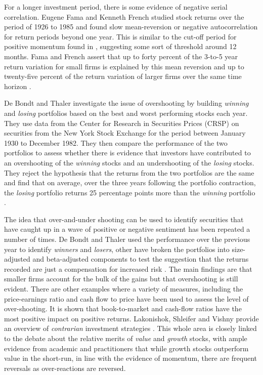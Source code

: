 \documentclass[12pt, a4paper, oneside]{article} %
\begin{document}
For a longer investment period, there is some evidence of negative serial correlation.  Eugene Fama and Kenneth French studied stock returns over the period of 1926 to 1985 and found slow mean-reversion or negative autocorrelation for return periods beyond one year.  This is similar to the cut-off period for positive momentum found in \citep{Jagadeesh}, suggesting some sort of threshold around 12 months.  Fama and French assert that up to forty percent of the 3-to-5 year return variation for small firms is explained by this mean reversion and up to twenty-five percent of the return variation of larger firms over the same time horizon \citep{FrenchFamaPermanent}. 

De Bondt and Thaler investigate the issue of overshooting by building \emph{winning} and \emph{losing} portfolios  based on the best and worst performing stocks each year.  They use data from the Center for Research in Securities Prices (CRSP) on securities from the New York Stock Exchange for the period between January 1930 to December 1982.  They then compare the performance of the two portfolios to assess whether there is evidence that investors have contributed to an overshooting of the \emph{winning} stocks and an undershooting of the \emph{losing} stocks.  They reject the hypothesis that the returns from the two portfolios are the same and find that on average, over the three years following the portfolio contraction, the \emph{losing} portfolio returns 25 percentage points more than the \emph{winning} portfolio \citep{DeBondtOver}.

The idea that over-and-under shooting can be used to identify securities that have caught up in a wave of positive or negative sentiment has been repeated a number of times.  De Bondt and Thaler used the performance over the previous year to identify \emph{winners} and \emph{losers}, other have broken the portfolios into size-adjusted and beta-adjusted components to test the suggestion that the returns recorded are just a compensation for increased risk  \citep{Chopra1992}.  The main findings are that smaller firms account for the bulk of the gains but that overshooting is still evident.  There are other examples where a variety of measures, including the price-earnings ratio \citep{BasuPE} and cash flow to price \citep{Chan1991} have been used to assess the level of over-shooting.  It is shown that book-to-market and cash-flow ratios have the most positive impact on positive returns.  Lakonishok, Shleifer and Vishny provide an overview of \emph{contrarian} investment strategies \citep{LakonishokContrarian}.  This whole area is closely linked to the debate about the relative merits of \emph{value} and \emph{growth} stocks, with ample evidence from academic and practitioners that while growth stocks outperform value in the short-run, in line with the evidence of momentum, there are frequent reversals as over-reactions are reversed.  
\end{document}
